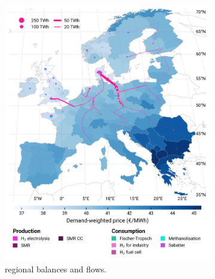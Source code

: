 \documentclass[final,5p,times,twocolumn,sort&compress]{elsarticle}
\begin{document}
\begin{figure}[htbp]
  \centering
  \begin{subfigure}[t]{0.49\textwidth}
      \vspace{0pt}
      \includegraphics[width=1\textwidth]{maps/pcipmi-national-international-expansion/base_s_adm___2030-balance_map_H2}
      \vspace{-0.5cm}
      \caption{ regional balances and flows.}
      \label{fig:PCI-in_lt_2030_h2}
  \end{subfigure}
  \hfill
  \begin{subfigure}[t]{0.49\textwidth}
      \vspace{0pt}

\end{subfigure}
\end{figure}
\end{document}
